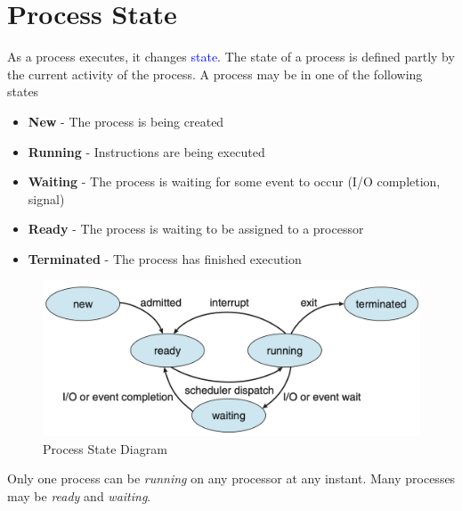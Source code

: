 \documentclass[oneside]{book}
\begin{document}
        \section{Process State}
            As a process executes, it changes \textcolor{blue}{state}. The state of a process is defined partly by the current 
            activity of the process. A process may be in one of the following states
            \begin{itemize}
                \item \textbf{New} - The process is being created
                \item \textbf{Running} - Instructions are being executed
                \item \textbf{Waiting} - The process is waiting for some event to occur (I/O completion, signal)
                \item \textbf{Ready} - The process is waiting to be assigned to a processor
                \item \textbf{Terminated} - The process has finished execution
            \end{itemize}
            \begin{figure}[H]
                \centering
                \includegraphics[width=0.6\linewidth]{figures/process_state.png}
                \caption{Process State Diagram}
            \end{figure}
            Only one process can be \textit{running} on any processor at any instant. Many processes may be \textit{ready} and \textit{waiting}.
\end{document}

